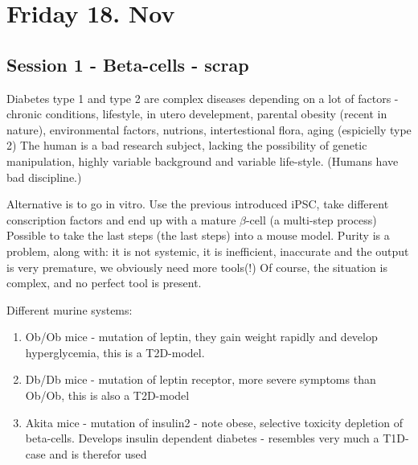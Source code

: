 \documentclass[12p]{article}
\begin{document}
\section*{Friday 18. Nov}

\subsection*{Session 1 - Beta-cells - scrap}

Diabetes type 1 and type 2 are complex diseases depending on a lot of factors - chronic conditions, lifestyle, in utero develepment, parental obesity (recent in nature), environmental factors, nutrions, intertestional flora, aging (espicielly type 2)
The human is a bad research subject, lacking the possibility of genetic manipulation, highly variable background and variable life-style.
(Humans have bad discipline.)

Alternative is to go in vitro.
Use the previous introduced  iPSC, take different conscription factors and end up with a mature $\beta$-cell (a multi-step process)
Possible to take the last steps (the last steps) into a mouse model.
Purity is a problem, along with: it is not systemic, it is inefficient, inaccurate and the output is very premature, we obviously need more tools(!)
Of course, the situation is complex, and no perfect tool is present.

Different murine systems:

\begin{enumerate}
    \item
	Ob/Ob mice - mutation of leptin, they gain weight rapidly and develop hyperglycemia, this is a T2D-model.
    \item
	Db/Db mice - mutation of leptin receptor, more severe symptoms than Ob/Ob, this is also a T2D-model
    \item
	Akita mice - mutation of insulin2 - note obese, selective toxicity depletion of beta-cells. Develops insulin dependent diabetes - resembles very much a T1D-case and is therefor used 
\end{enumerate}
\end{document}
